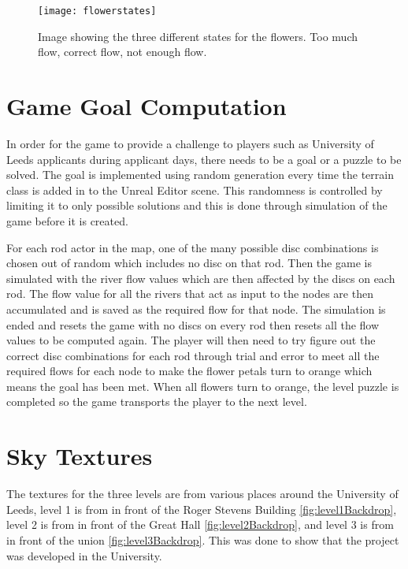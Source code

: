 \begin{figure}[h]
	\texttt{[image: flowerstates]}
	\centering
	\caption{Image showing the three different states for the flowers. Too much flow, correct flow, not enough flow.}
	\label{fig:flowerstates}
\end{figure}

\section{Game Goal Computation}
In order for the game to provide a challenge to players such as University of Leeds applicants during applicant days, there needs to be a goal or a puzzle to be solved. The goal is implemented using random generation every time the terrain class is added in to the Unreal Editor scene. This randomness is controlled by limiting it to only possible solutions and this is done through simulation of the game before it is created.
\newline
\par
For each rod actor in the map, one of the many possible disc combinations is chosen out of random which includes no disc on that rod. Then the game is simulated with the river flow values which are then affected by the discs on each rod. The flow value for all the rivers that act as input to the nodes are then accumulated and is saved as the required flow for that node. The simulation is ended and resets the game with no discs on every rod then resets all the flow values to be computed again. The player will then need to try figure out the correct disc combinations for each rod through trial and error to meet all the required flows for each node to make the flower petals turn to orange which means the goal has been met. When all flowers turn to orange, the level puzzle is completed so the game transports the player to the next level.

\section{Sky Textures}
The textures for the three levels are from various places around the University of Leeds, level 1 is from in front of the Roger Stevens Building \ref{fig:level1Backdrop}, level 2 is from in front of the Great Hall \ref{fig:level2Backdrop}, and level 3 is from in front of the union \ref{fig:level3Backdrop}. This was done to show that the project was developed in the University.

\clearpage

